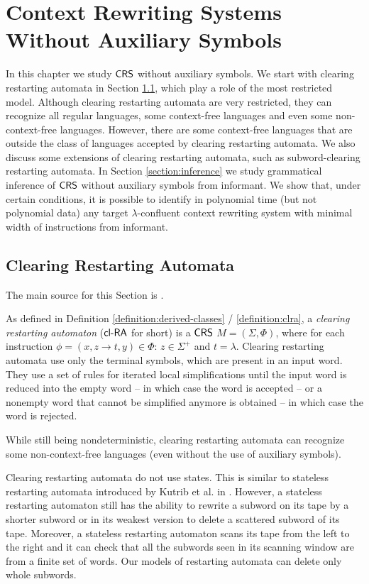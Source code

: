 \chapter{Context Rewriting Systems Without Auxiliary Symbols}\label{chapter:crs_nonaux}

In this chapter we study $\mbox{\sf CRS\/}$ without auxiliary symbols. We start with clearing restarting automata in Section \ref{section:clra}, which play a role of the most restricted model. Although clearing restarting automata are very restricted, they can recognize all regular languages, some context-free languages and even some non-context-free languages. However, there are some context-free languages that are outside the class of languages accepted by clearing restarting automata. We also discuss some extensions of clearing restarting automata, such as subword-clearing restarting automata. In Section \ref{section:inference} we study grammatical inference of $\mbox{\sf CRS\/}$ without auxiliary symbols from informant. We show that, under certain conditions, it is possible to identify in polynomial time (but not polynomial data) any target $\lambda$-confluent context rewriting system with minimal width of instructions from informant.

\section{Clearing Restarting Automata}\label{section:clra}

The main source for this Section is \cite{C10Diploma, CM10}.

As defined in Definition \ref{definition:derived-classes} / \ref{definition:clra}, a \emph{clearing restarting automaton} \cite{CM10} (\emph{$\mbox{\sf cl-RA\/}$} for short) is a $\mbox{\sf CRS\/}$ $M = (\Sigma, \Phi)$, where for each instruction $\phi = (x, z \to t, y) \in \Phi$: $z \in \Sigma^+$ and $t = \lambda$. Clearing restarting automata use only the terminal symbols, which are present in an input word. They use a set of rules for iterated local simplifications until the input word is reduced into the empty word -- in which case the word is accepted -- or a nonempty word that cannot be simplified anymore is obtained -- in which case the word is rejected.

While still being nondeterministic, clearing restarting automata can recognize some non-context-free languages (even without the use of auxiliary symbols).

Clearing restarting automata do not use states. This is similar to stateless restarting automata introduced by Kutrib et al. in \cite{KuMeOt08}. However, a stateless restarting automaton still has the ability to rewrite a subword on its tape by a shorter subword or in its weakest version to delete a scattered subword of its tape. Moreover, a stateless restarting automaton scans its tape from the left to the right and it can check that all the subwords seen in its scanning window are from a finite set of words. Our models of restarting automata can delete only whole subwords.

